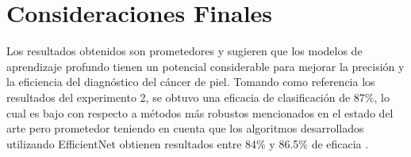         

\section{Consideraciones Finales}\label{subsubsec:final_considerations}

Los resultados obtenidos son prometedores y sugieren que los modelos de aprendizaje profundo tienen un potencial considerable para mejorar la precisión y la eficiencia del diagnóstico del cáncer de piel. Tomando como referencia los resultados del experimento 2, se obtuvo una eficacia de clasificación de 87\%, lo cual es bajo con respecto a métodos más robustos mencionados en el estado del arte pero prometedor teniendo en cuenta que los algoritmos desarrollados utilizando EfficientNet obtienen resultados entre 84\% y 86.5\% de eficacia .

